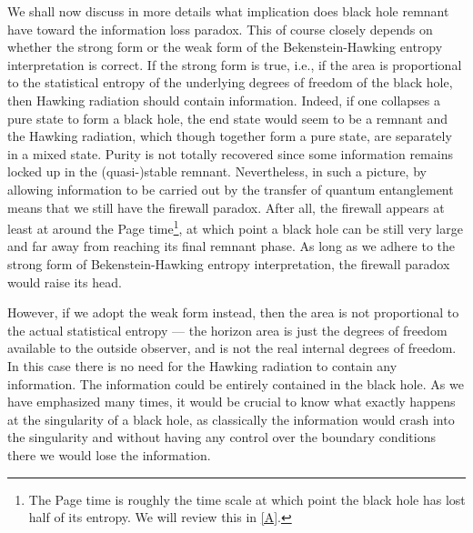 \documentclass[12pt]{article}
\newcommand{\2}{$^2$}
\newcommand{\3}{$^3$}
\newcommand{\4}{$_4$}
\newcommand{\5}{$_5$}
\begin{document}
We shall now discuss in more details what implication does black hole remnant have toward the information loss paradox. This of course closely depends on whether the strong form or the weak form of the Bekenstein-Hawking entropy interpretation is correct. If the strong form is true, i.e., if the area is proportional to the statistical entropy of the underlying degrees of freedom of the black hole, then Hawking radiation should contain information. Indeed, if one collapses a pure state to form a black hole, the end state would seem to be a
remnant and the Hawking radiation, which though together form a pure state, are separately in a mixed state. Purity is not totally recovered since some information remains locked up in the (quasi-)stable remnant. Nevertheless, in such a picture, by allowing information to be carried out by the transfer of quantum entanglement means that we still have the firewall paradox. After all, the firewall appears at least at around the Page time\footnote{The Page time is roughly the time scale at which point the black hole has lost half of its entropy. We will review this in \ref{A}.}, at which point a black hole can be still very large and far away from reaching its final remnant phase. As long as we adhere to the strong form of Bekenstein-Hawking entropy interpretation, the firewall paradox would raise its head. 

However, if we adopt the weak form instead, then the area is not proportional to the actual statistical entropy --- the horizon area is just the degrees of freedom available to the outside observer, and is not the real internal degrees of freedom. In this case there is no need for the Hawking radiation to contain any information. 
The information could be entirely contained in the black hole. As we have emphasized many times, it would be crucial to know what exactly happens at the singularity of a black hole, as classically the information would crash into the singularity and without having any control over the boundary conditions there we would lose the information. %
\end{document}
